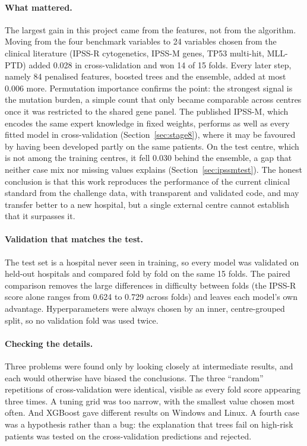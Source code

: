 \documentclass[11pt,a4paper]{article}
\begin{document}
\paragraph{What mattered.} The largest gain in this project came from the features, not from
the algorithm. Moving from the four benchmark variables to 24 variables chosen from the
clinical literature (IPSS-R cytogenetics, IPSS-M genes, TP53 multi-hit, MLL-PTD) added
0.028 in cross-validation and won 14 of 15 folds. Every later step, namely 84 penalised
features, boosted trees and the ensemble, added at most 0.006 more. Permutation importance
confirms the point: the strongest signal is the mutation burden, a simple count that only
became comparable across centres once it was restricted to the shared gene panel.
The published IPSS-M, which encodes the same expert knowledge in fixed weights, performs
as well as every fitted model in cross-validation (Section~\ref{sec:stage8}), where it may
be favoured by having been developed partly on the same patients. On the test centre, which
is not among the training centres, it fell 0.030 behind the ensemble, a gap that neither case mix nor missing values
explains (Section~\ref{sec:ipssmtest}). The honest conclusion is that this work reproduces
the performance of the current clinical standard from the challenge data, with transparent
and validated code, and may transfer better to a new hospital, but a single external centre
cannot establish that it surpasses it.

\paragraph{Validation that matches the test.} The test set is a hospital never seen in
training, so every model was validated on held-out hospitals and compared fold by fold on
the same 15 folds. The paired comparison removes the large differences in difficulty
between folds (the IPSS-R score alone ranges from 0.624 to 0.729 across folds) and leaves
each model's own advantage. Hyperparameters were always chosen by an inner,
centre-grouped split, so no validation fold was used twice.

\paragraph{Checking the details.} Three problems were found only by looking closely at
intermediate results, and each would otherwise have biased the conclusions. The three
``random'' repetitions of cross-validation were identical, visible as every fold score
appearing three times. A tuning grid was too narrow, with the smallest value chosen most
often. And XGBoost gave different results on Windows and Linux. A fourth case was a
hypothesis rather than a bug: the explanation that trees fail on high-risk patients was
tested on the cross-validation predictions and rejected.
\end{document}
